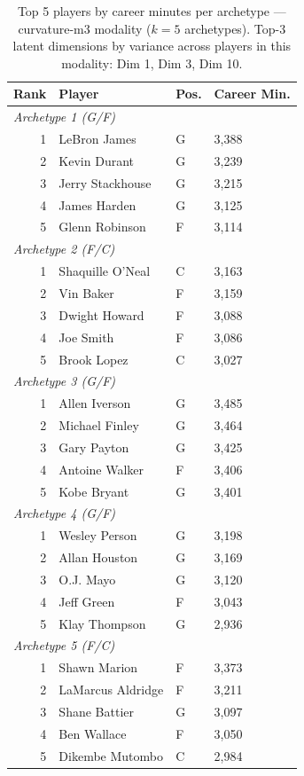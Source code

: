 \begin{table}[htbp]
  \centering\small
  \begin{tabular}{rlll}
    \toprule
    Rank & Player & Pos. & Career Min. \\
    \midrule
    \multicolumn{4}{l}{\textit{Archetype 1 (G/F)}} \\
    \midrule
    1 & LeBron James & G & 3,388 \\
    2 & Kevin Durant & G & 3,239 \\
    3 & Jerry Stackhouse & G & 3,215 \\
    4 & James Harden & G & 3,125 \\
    5 & Glenn Robinson & F & 3,114 \\
    \midrule[0.4pt]
    \multicolumn{4}{l}{\textit{Archetype 2 (F/C)}} \\
    \midrule
    1 & Shaquille O'Neal & C & 3,163 \\
    2 & Vin Baker & F & 3,159 \\
    3 & Dwight Howard & F & 3,088 \\
    4 & Joe Smith & F & 3,086 \\
    5 & Brook Lopez & C & 3,027 \\
    \midrule[0.4pt]
    \multicolumn{4}{l}{\textit{Archetype 3 (G/F)}} \\
    \midrule
    1 & Allen Iverson & G & 3,485 \\
    2 & Michael Finley & G & 3,464 \\
    3 & Gary Payton & G & 3,425 \\
    4 & Antoine Walker & F & 3,406 \\
    5 & Kobe Bryant & G & 3,401 \\
    \midrule[0.4pt]
    \multicolumn{4}{l}{\textit{Archetype 4 (G/F)}} \\
    \midrule
    1 & Wesley Person & G & 3,198 \\
    2 & Allan Houston & G & 3,169 \\
    3 & O.J. Mayo & G & 3,120 \\
    4 & Jeff Green & F & 3,043 \\
    5 & Klay Thompson & G & 2,936 \\
    \midrule[0.4pt]
    \multicolumn{4}{l}{\textit{Archetype 5 (F/C)}} \\
    \midrule
    1 & Shawn Marion & F & 3,373 \\
    2 & LaMarcus Aldridge & F & 3,211 \\
    3 & Shane Battier & G & 3,097 \\
    4 & Ben Wallace & F & 3,050 \\
    5 & Dikembe Mutombo & C & 2,984 \\
    \bottomrule
  \end{tabular}
  \caption{Top 5 players by career minutes per archetype --- curvature-m3 modality ($k=5$ archetypes). Top-3 latent dimensions by variance across players in this modality: Dim 1, Dim 3, Dim 10.}
  \label{tab:arch_reps_curvature_m3}
\end{table}

